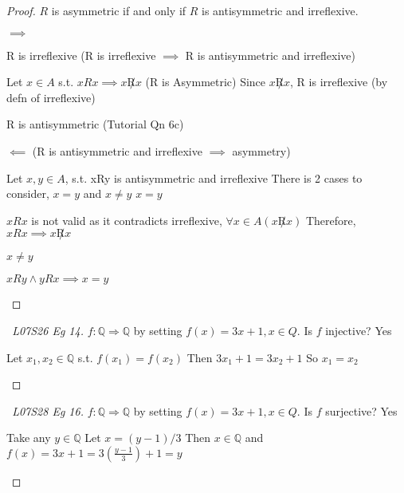\documentclass[a4paper]{article}
\theoremstyle{definition}
\begin{document}
\begin{proof} $R$ is asymmetric if and only if $R$ is antisymmetric and irreflexive.
  \begin{numpf}
  \pfln $\implies$
  \begin{subpf}
    \pfln R is irreflexive (R is irreflexive $\implies$ R is antisymmetric and irreflexive)
    \begin{subpf}
      \pfln Let $x \in A$ s.t. $xRx \implies x \not R x$ (R is Asymmetric)
      \pfln Since $x\not R x$, R is irreflexive (by defn of irreflexive)
    \end{subpf}
  \end{subpf}
  \begin{subpf}
    \pfln R is antisymmetric (Tutorial Qn 6c)
  \end{subpf}
  \pfln $\impliedby$ (R is antisymmetric and irreflexive $\implies$ asymmetry)
  \begin{subpf}
    \pfln Let $x, y \in A$, s.t. xRy is antisymmetric and irreflexive
    \pfln There is 2 cases to consider, $x = y$ and $x \not = y$
    \pfln $x = y$
    \begin{subpf}
      \pfln $xRx$ is not valid as it contradicts irreflexive, $\forall x \in A(x\not R x)$
      \pfln Therefore, $xRx \implies x\not R x$
    \end{subpf}
    \pfln $x \not = y$
    \begin{subpf}
      \pfln $xRy \land yRx \implies x = y$
    \end{subpf}
  \end{subpf}
  \end{numpf}
\end{proof}

\begin{proof}[\proofname\ L07S26 Eg 14] $f: \mathbb{Q} \Rightarrow \mathbb{Q}$ by setting $f(x) = 3x+1, x \in Q$. Is $f$ injective?
  Yes
  \begin{numpf}
    \pfln Let $x_1, x_2 \in \mathbb{Q}$ s.t. $f(x_1) = f(x_2)$
    \pfln Then $3x_1 + 1 = 3x_2 + 1$
    \pfln So $x_1 = x_2$
  \end{numpf}
\end{proof}

\begin{proof}[\proofname\ L07S28 Eg 16] $f: \mathbb{Q} \Rightarrow \mathbb{Q}$ by setting $f(x) = 3x+1, x \in Q$. Is $f$ surjective?
  Yes
  \begin{numpf}
    \pfln Take any $y \in \mathbb{Q}$
    \pfln Let $x = (y - 1) / 3$
    \pfln Then $x \in \mathbb{Q}$ and $f(x) = 3x + 1 = 3(\frac{y-1}{3}) + 1 = y$
  \end{numpf}
\end{proof}
\end{document}
